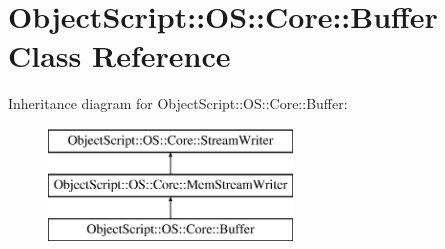\hypertarget{class_object_script_1_1_o_s_1_1_core_1_1_buffer}{}\section{Object\+Script\+:\+:OS\+:\+:Core\+:\+:Buffer Class Reference}
\label{class_object_script_1_1_o_s_1_1_core_1_1_buffer}
Inheritance diagram for Object\+Script\+:\+:OS\+:\+:Core\+:\+:Buffer\+:\begin{figure}[H]
\begin{center}
\leavevmode
\includegraphics[height=3.000000cm]{class_object_script_1_1_o_s_1_1_core_1_1_buffer}
\end{center}
\end{figure}
